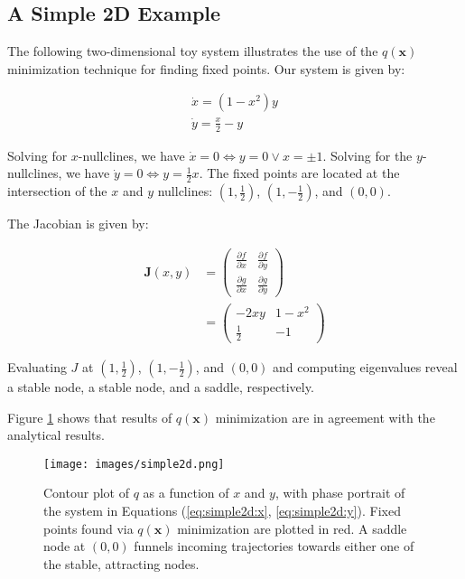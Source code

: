 \documentclass{article} %
\newcommand{\bf}[1]{\mathbf{#1}}
\newcommand{\x}{\bf{x}}
\newcommand{\p}{\partial}
\newcommand{\pf}[2]{\frac{\p{#1}}{\p{#2}}}
\begin{document}

\subsection{A Simple 2D Example}

The following two-dimensional toy system illustrates the use of the $q(\x)$ minimization technique for finding fixed points. Our system is given by:

\begin{align} %
\dot{x} = (1-x^2)y  \label{eq:simple2d:x}  \\
\dot{y} = \frac{x}{2}-y  \label{eq:simple2d:y}
\end{align}

Solving for $x$-nullclines, we have $\dot{x} = 0 \iff y = 0 \lor x = \pm 1$. Solving for the $y$-nullclines, we have $\dot{y} = 0 \iff y = \frac{1}{2}x$. The fixed points are located at the intersection of the $x$ and $y$ nullclines: $(1,\frac{1}{2})$, $(1,-\frac{1}{2})$, and $(0,0)$.

The Jacobian is given by:

\begin{align}
  \bf{J}(x,y) &= \begin{pmatrix}
    \pf{f}{x} & \pf{f}{y}\\
    \pf{g}{x} & \pf{g}{y}
    \end{pmatrix}
    \\
&= \begin{pmatrix}
    -2xy & 1-x^2\\
    \frac{1}{2} & -1
    \end{pmatrix}
\end{align}

Evaluating $J$ at $(1,\frac{1}{2})$, $(1,-\frac{1}{2})$, and $(0,0)$ and computing eigenvalues reveal a stable node, a stable node, and a saddle, respectively.

Figure \ref{fig:simple2d} shows that results of $q(\x)$ minimization are in agreement with the analytical results.

\begin{figure}
\centering
\texttt{[image: images/simple2d.png]}
\caption{Contour plot of $q$ as a function of $x$ and $y$, with phase portrait of the system in Equations (\ref{eq:simple2d:x}, \ref{eq:simple2d:y}). Fixed points found via $q(\x)$ minimization are plotted in red. A saddle node at $(0,0)$ funnels incoming trajectories towards either one of the stable, attracting nodes.}
\label{fig:simple2d}
\end{figure}
\end{document}
